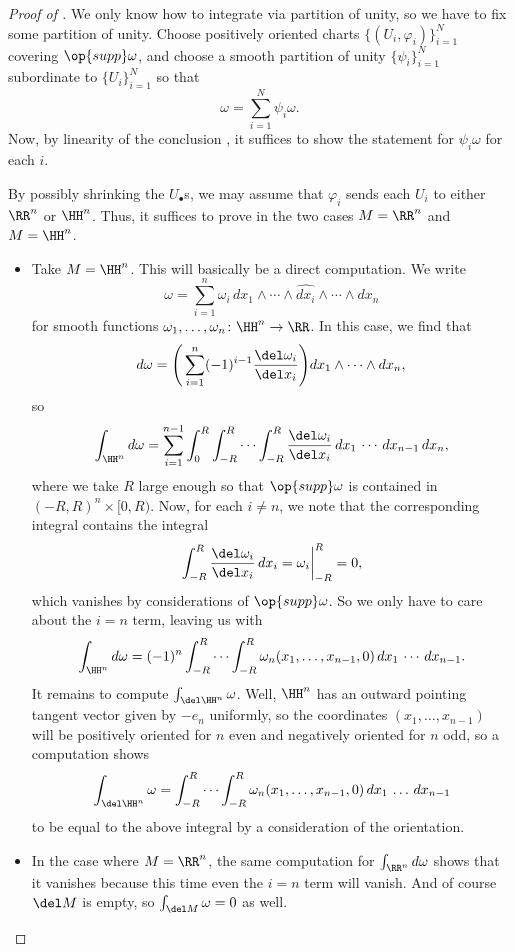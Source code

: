 \documentclass[../notes.tex]{subfiles}
\begin{document}
\begin{proof}[Proof of ]
	We only know how to integrate via partition of unity, so we have to fix some partition of unity. Choose positively oriented charts $\{(U_i,\varphi_i)\}_{i=1}^N$ covering $\op{supp}\omega$, and choose a smooth partition of unity $\{\psi_i\}_{i=1}^N$ subordinate to $\{U_i\}_{i=1}^N$ so that
	\[\omega=\sum_{i=1}^N\psi_i\omega.\]
	Now, by linearity of the conclusion , it suffices to show the statement for $\psi_i\omega$ for each $i$.

	By possibly shrinking the $U_\bullet$s, we may assume that $\varphi_i$ sends each $U_i$ to either $\RR^n$ or $\HH^n$. Thus, it suffices to prove  in the two cases $M=\RR^n$ and $M=\HH^n$.
	\begin{itemize}
		\item Take $M=\HH^n$. This will basically be a direct computation. We write
		\[\omega=\sum_{i=1}^n\omega_i\,dx_1\land\cdots\land\widehat{dx_i}\land\cdots\land dx_n\]
		for smooth functions $\omega_1,\ldots,\omega_n\colon\HH^n\to\RR$. In this case, we find that
		\[d\omega=\Bigg(\sum_{i=1}^n(-1)^{i-1}\frac{\del\omega_i}{\del x_i}\Bigg)dx_1\land\cdots\land dx_n,\]
		so
		\[\int_{\HH^n}d\omega=\sum_{i=1}^{n-1}\int_0^R\int_{-R}^R\cdots\int_{-R}^R\frac{\del\omega_i}{\del x_i}\,dx_1\,\cdots\,dx_{n-1}\,dx_n,\]
		where we take $R$ large enough so that $\op{supp}\omega$ is contained in $(-R,R)^n\times[0,R)$. Now, for each $i\ne n$, we note that the corresponding integral contains the integral
		\[\int_{-R}^R\frac{\del\omega_i}{\del x_i}\,dx_i=\omega_i\bigg|_{-R}^R=0,\]
		which vanishes by considerations of $\op{supp}\omega$. So we only have to care about the $i=n$ term, leaving us with
		\[\int_{\HH^n}d\omega=(-1)^n\int_{-R}^R\cdots\int_{-R}^R\omega_n(x_1,\ldots,x_{n-1},0)\,dx_1\,\cdots\,dx_{n-1}.\]
		It remains to compute $\int_{\del\HH^n}\omega$. Well, $\HH^n$ has an outward pointing tangent vector given by $-e_n$ uniformly, so the coordinates $(x_1,\ldots,x_{n-1})$ will be positively oriented for $n$ even and negatively oriented for $n$ odd, so a computation shows
		\[\int_{\del\HH^n}\omega=\int_{-R}^R\cdots\int_{-R}^R\omega_n(x_1,\ldots,x_{n-1},0)\,dx_1\,\ldots\,dx_{n-1}\]
		to be equal to the above integral by a consideration of the orientation.

		\item In the case where $M=\RR^n$, the same computation for $\int_{\RR^n}d\omega$ shows that it vanishes because this time even the $i=n$ term will vanish. And of course $\del M$ is empty, so $\int_{\del M}\omega=0$ as well.
		\qedhere
	\end{itemize}
\end{proof}
\end{document}
